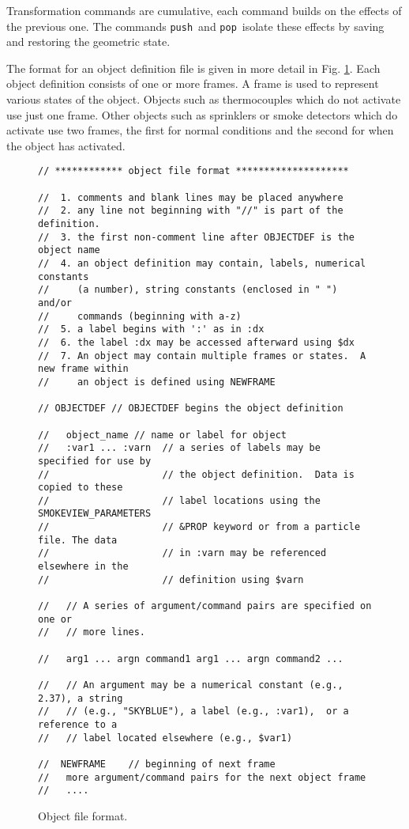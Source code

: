 \documentclass[11pt,twoside]{book}
\begin{document}
Transformation commands are cumulative, each command builds on the
effects of the previous one.  The commands {\tt push}\ and
{\tt pop}\ isolate these effects by saving and restoring the geometric state.

The format for an object definition file is given in more detail
in Fig. \ref{figobjectdef}.  Each object definition consists of
one or more frames.  A frame is used to represent various states
of the object. Objects such as thermocouples which do not activate
use just one frame. Other objects such as sprinklers or smoke
detectors which do activate use two frames, the first for normal
conditions and the second for when the object has activated.

\begin{figure}[bph]
{\small
\begin{lstlisting}[frame=single,rulecolor=\color{yellow},
framerule=1pt,framesep=1pc,fillcolor=\color{yellow}]
// ************ object file format ********************

//  1. comments and blank lines may be placed anywhere
//  2. any line not beginning with "//" is part of the definition.
//  3. the first non-comment line after OBJECTDEF is the object name
//  4. an object definition may contain, labels, numerical constants
//     (a number), string constants (enclosed in " ") and/or
//     commands (beginning with a-z)
//  5. a label begins with ':' as in :dx
//  6. the label :dx may be accessed afterward using $dx
//  7. An object may contain multiple frames or states.  A new frame within
//     an object is defined using NEWFRAME

// OBJECTDEF // OBJECTDEF begins the object definition

//   object_name // name or label for object
//   :var1 ... :varn  // a series of labels may be specified for use by
//                    // the object definition.  Data is copied to these
//                    // label locations using the SMOKEVIEW_PARAMETERS
//                    // &PROP keyword or from a particle file. The data
//                    // in :varn may be referenced  elsewhere in the
//                    // definition using $varn

//   // A series of argument/command pairs are specified on one or
//   // more lines.

//   arg1 ... argn command1 arg1 ... argn command2 ...

//   // An argument may be a numerical constant (e.g., 2.37), a string
//   // (e.g., "SKYBLUE"), a label (e.g., :var1),  or a reference to a
//   // label located elsewhere (e.g., $var1)

//  NEWFRAME    // beginning of next frame
//   more argument/command pairs for the next object frame
//   ....
\end{lstlisting}
}
\caption{Object file format.}
\label{figobjectdef}%
\end{figure}
\end{document}
